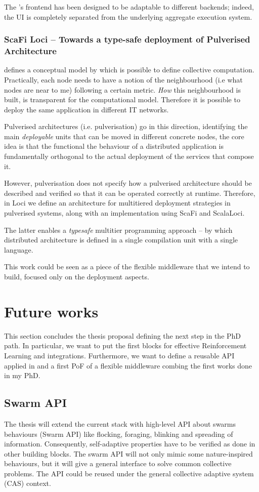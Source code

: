 \documentclass[11pt]{article}
\begin{document}
The \scafiweb{}'s frontend has been designed to be adaptable to different backends; indeed, the UI is completely separated from the underlying aggregate execution system. 

\subsubsection{ScaFi Loci -- Towards a type-safe deployment of Pulverised Architecture}
\ac{} defines a conceptual model by which is possible to define collective computation. Practically, each node needs to have a notion of the neighbourhood (i.e what nodes are near to me) following a certain metric. \textit{How} this neighbourhood is built, is transparent for the computational model. Therefore it is possible to deploy the same application in different IT networks.

Pulverised architectures (i.e. pulverisation) go in this direction, identifying the main \textit{deployable} units that can be moved in different concrete nodes, the core idea is that the functional
the behaviour of a distributed application is fundamentally orthogonal to the actual deployment of the services that compose it.

However, pulverisation does not specify how a pulverised architecture should
be described and verified so that it can be operated correctly
at runtime.
Therefore, in \scafiweb Loci we define an architecture for multitiered deployment strategies in pulverised systems, along with an implementation using ScaFi and ScalaLoci.

The latter enables a \textit{typesafe} multitier programming approach -- by which distributed architecture is defined
in a single compilation unit with a single language.

This work could be seen as a piece of the flexible middleware that we intend to build, focused only on the deployment aspects.

\section{Future works}\label{future}
This section concludes the thesis proposal defining the next step in the PhD path. In particular, we want to put the first blocks for effective Reinforcement Learning and \acfull{} integrations. Furthermore, we want to define a reusable API applied in \cpsw{} and a first PoF of a flexible middleware combing the first works done in my PhD. 
\subsection{Swarm API}
The thesis will extend the current \ac{} stack with high-level API about swarms behaviours (Swarm API) like flocking, foraging, blinking and spreading of information.  Consequently, self-adaptive properties have to be verified as done in other building blocks.  The swarm API will not only mimic some nature-inspired behaviours, but it will give a general interface to solve common collective problems. The API could be reused under the general collective adaptive system (CAS) context.
\end{document}
